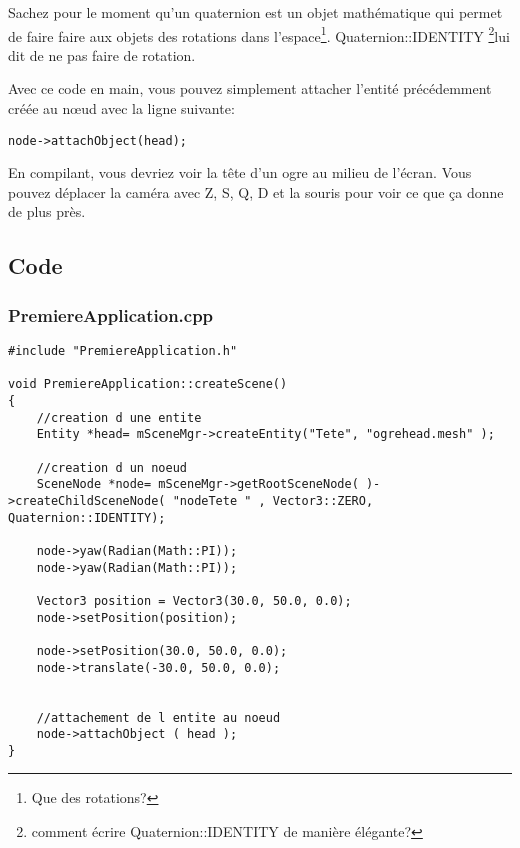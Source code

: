 Sachez pour le moment qu'un quaternion est un objet mathématique qui permet de faire faire aux objets des rotations dans l'espace\footnote{Que des rotations?}. Quaternion::IDENTITY \footnote{comment écrire Quaternion::IDENTITY de manière élégante?}lui dit de ne pas faire de rotation.\newline

Avec ce code en main, vous pouvez simplement attacher l'entité précédemment créée au nœud avec la ligne suivante:

\begin{lstlisting}
node->attachObject(head);
\end{lstlisting}

En compilant, vous devriez voir la tête d'un ogre au milieu de l'écran. Vous pouvez déplacer la caméra avec Z, S, Q, D et la souris pour voir ce que ça donne de plus près.



\subsection{Code}

\subsubsection{PremiereApplication.cpp}
\begin{lstlisting}[caption={PremiereApplication.cpp: Instanciation d'entité}]
#include "PremiereApplication.h"

void PremiereApplication::createScene()
{
    //creation d une entite
    Entity *head= mSceneMgr->createEntity("Tete", "ogrehead.mesh" );
    
    //creation d un noeud
    SceneNode *node= mSceneMgr->getRootSceneNode( )->createChildSceneNode( "nodeTete " , Vector3::ZERO, Quaternion::IDENTITY);
    
    node->yaw(Radian(Math::PI));
    node->yaw(Radian(Math::PI));

    Vector3 position = Vector3(30.0, 50.0, 0.0);
    node->setPosition(position);

    node->setPosition(30.0, 50.0, 0.0); 
    node->translate(-30.0, 50.0, 0.0); 
    
    
    //attachement de l entite au noeud
    node->attachObject ( head );
}
\end{lstlisting}








